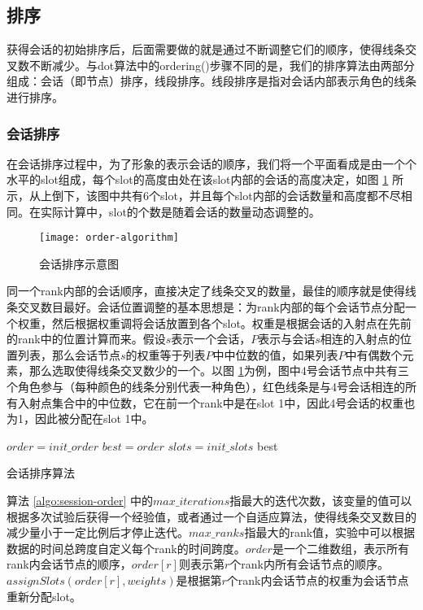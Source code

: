 \subsection{排序}
获得会话的初始排序后，后面需要做的就是通过不断调整它们的顺序，使得线条交叉数不断减少。与dot算法中的ordering()步骤不同的是，我们的排序算法由两部分组成：会话（即节点）排序，线段排序。线段排序是指对会话内部表示角色的线条进行排序。
\subsubsection{会话排序}
在会话排序过程中，为了形象的表示会话的顺序，我们将一个平面看成是由一个个水平的slot组成，每个slot的高度由处在该slot内部的会话的高度决定，如图 \ref{fig:order-algorithm} 所示，从上倒下，该图中共有6个slot，并且每个slot内部的会话数量和高度都不尽相同。在实际计算中，slot的个数是随着会话的数量动态调整的。
\begin{figure}[htb]
    \centering
        \texttt{[image: order-algorithm]}
    \caption{会话排序示意图}
    \label{fig:order-algorithm}
\end{figure}
同一个rank内部的会话顺序，直接决定了线条交叉的数量，最佳的顺序就是使得线条交叉数目最好。会话位置调整的基本思想是\cite{warfield1977crossing}：为rank内部的每个会话节点分配一个权重，然后根据权重调将会话放置到各个slot。权重是根据会话的入射点在先前的rank中的位置计算而来。假设$s$表示一个会话，$P$表示与会话$s$相连的入射点的位置列表，那么会话节点$s$的权重等于列表$P$中中位数的值，如果列表$P$中有偶数个元素，那么选取使得线条交叉数少的一个。以图 \ref{fig:order-algorithm}为例，图中4号会话节点中共有三个角色参与（每种颜色的线条分别代表一种角色），红色线条是与4号会话相连的所有入射点集合中的中位数，它在前一个rank中是在slot 1中，因此4号会话的权重也为1，因此被分配在slot 1中。

\begin{algorithm}[!htb]
  $order = init\_order$\;
  $best = order$\;
  $slots = init\_slots$\;
  \Return best\;
  \caption{会话排序算法}
  \label{algo:session-order}
\end{algorithm}
算法 \ref{algo:session-order} 中的$max\_iterations$指最大的迭代次数，该变量的值可以根据多次试验后获得一个经验值，或者通过一个自适应算法，使得线条交叉数目的减少量小于一定比例后才停止迭代。$max\_ranks$指最大的rank值，实验中可以根据数据的时间总跨度自定义每个rank的时间跨度。$order$是一个二维数组，表示所有rank内会话节点的顺序，$order[r]$则表示第$r$个rank内所有会话节点的顺序。
$assignSlots(order[r], weights)$是根据第$r$个rank内会话节点的权重为会话节点重新分配slot。

